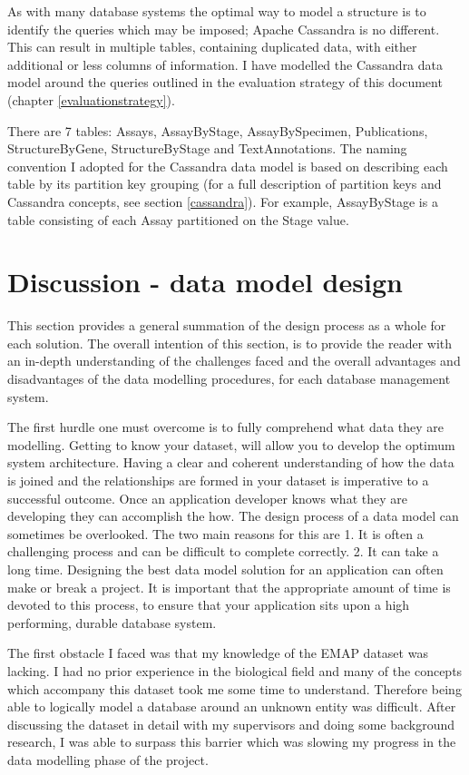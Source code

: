 As with many database systems the optimal way to model a structure is to identify the queries which may be imposed; Apache Cassandra is no different. This can result in multiple tables, containing duplicated data, with either additional or less columns of information. I have modelled the Cassandra data model around the queries outlined in the evaluation strategy of this document (chapter \ref{evaluationstrategy}).

There are 7 tables: Assays, AssayByStage, AssayBySpecimen, Publications, StructureByGene, StructureByStage and TextAnnotations. The naming convention I adopted for the Cassandra data model is based on describing each table by its partition key grouping (for a full description of partition keys and Cassandra concepts, see section \ref{cassandra}). For example, AssayByStage is a table consisting of each Assay partitioned on the Stage value.
\newpage
\section{Discussion - data model design}\label{designdiscussion}
This section provides a general summation of the design process as a whole for each solution. The overall intention of this section, is to provide the reader with an in-depth understanding of the challenges faced and the overall advantages and disadvantages of the data modelling procedures, for each database management system.

The first hurdle one must overcome is to fully comprehend what data they are modelling. Getting to know your dataset, will allow you to develop the optimum system architecture. Having a clear and coherent understanding of how the data is joined and the relationships are formed in your dataset is imperative to a successful outcome. Once an application developer knows what they are developing they can accomplish the how. The design process of a data model can sometimes be overlooked. The two main reasons for this are 1. It is often a challenging process and can be difficult to complete correctly. 2. It can take a long time. Designing the best data model solution for an application can often make or break a project. It is important that the appropriate amount of time is devoted to this process, to ensure that your application sits upon a high performing, durable database system.

The first obstacle I faced was that my knowledge of the EMAP dataset was lacking. I had no prior experience in the biological field and many of the concepts which accompany this dataset took me some time to understand. Therefore being able to logically model a database around an unknown entity was difficult. After discussing the dataset in detail with my supervisors and doing some background research, I was able to surpass this barrier which was slowing my progress in the data modelling phase of the project.

